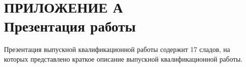 \documentclass[a4paper,14pt, unknownkeysallowed]{extreport}
\begin{document}

%




\renewcommand{\contentsname}{СОДЕРЖАНИЕ} %
\tableofcontents















\chapter*{ПРИЛОЖЕНИЕ А\\Презентация работы}
Презентация выпускной квалификационной работы содержит 17 сладов, на которых представлено краткое описание выпускной квалификационной работы.
%
\end{document}

